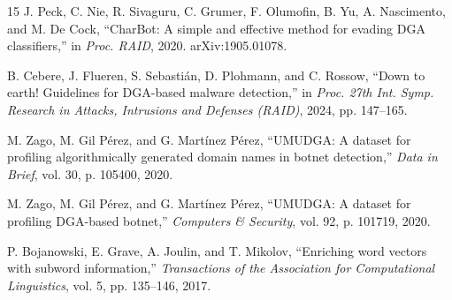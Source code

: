 \documentclass[conference]{IEEEtran}
\begin{document}
\begin{thebibliography}{15}
J. Peck, C. Nie, R. Sivaguru, C. Grumer, F. Olumofin, B. Yu, A. Nascimento, and M. De Cock, ``CharBot: A simple and effective method for evading DGA classifiers,'' in \emph{Proc. RAID}, 2020. arXiv:1905.01078.

B. Cebere, J. Flueren, S. Sebasti\'an, D. Plohmann, and C. Rossow, ``Down to earth! Guidelines for DGA-based malware detection,'' in \emph{Proc. 27th Int. Symp. Research in Attacks, Intrusions and Defenses (RAID)}, 2024, pp. 147--165.

M. Zago, M. Gil P\'erez, and G. Mart\'inez P\'erez, ``UMUDGA: A dataset for profiling algorithmically generated domain names in botnet detection,'' \emph{Data in Brief}, vol. 30, p. 105400, 2020.

M. Zago, M. Gil P\'erez, and G. Mart\'inez P\'erez, ``UMUDGA: A dataset for profiling DGA-based botnet,'' \emph{Computers \& Security}, vol. 92, p. 101719, 2020.

P. Bojanowski, E. Grave, A. Joulin, and T. Mikolov, ``Enriching word vectors with subword information,'' \emph{Transactions of the Association for Computational Linguistics}, vol. 5, pp. 135--146, 2017.

\end{thebibliography}
\end{document}
